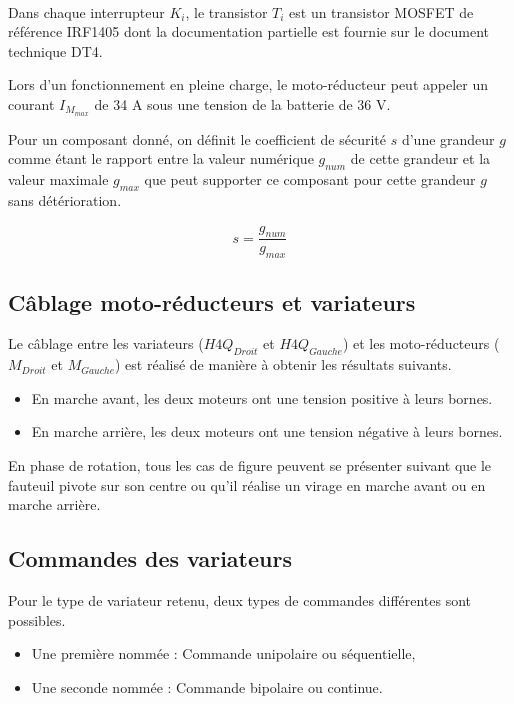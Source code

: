 ~\

Dans chaque interrupteur $K_i$, le transistor $T_i$ est un transistor MOSFET de référence IRF1405 dont la documentation partielle est fournie sur le document technique DT4.

Lors d'un fonctionnement en pleine charge, le moto-réducteur peut appeler un courant $I_{M_{max}}$ de 34 A sous une tension de la batterie de 36 V.

\newpage

Pour un composant donné, on définit le coefficient de sécurité $s$ d'une grandeur $g$ comme étant le rapport entre la valeur numérique $g_{num}$ de cette grandeur et la valeur maximale $g_{max}$ que peut supporter ce composant pour cette grandeur $g$ sans détérioration.

$$s=\dfrac{g_{num}}{g_{max}}$$


\subsection{Câblage moto-réducteurs et variateurs}

Le câblage entre les variateurs ($H4Q_{Droit}$ et $H4Q_{Gauche}$) et les moto-réducteurs ($M_{Droit}$ et $M_{Gauche}$) est réalisé de manière à obtenir les résultats suivants.

\begin{itemize}
 \item En marche avant, les deux moteurs ont une tension positive à leurs bornes.
 \item En marche arrière, les deux moteurs ont une tension négative à leurs bornes.
\end{itemize}

En phase de rotation, tous les cas de figure peuvent se présenter suivant que le fauteuil pivote sur son centre ou qu'il réalise un virage en marche avant ou en marche arrière.

\subsection{Commandes des variateurs}

Pour le type de variateur retenu, deux types de commandes différentes sont possibles.

\begin{itemize}
 \item Une première nommée : Commande unipolaire ou séquentielle,
 \item Une seconde nommée : Commande bipolaire ou continue.
\end{itemize}

